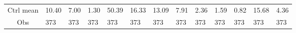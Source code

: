 {\begin{tabular}{@{}S*{12}{P}@{}}
Ctrl mean           &       10.40         &        7.00         &        1.30         &       50.39         &       16.33         &       13.09         &        7.91         &        2.36         &        1.59         &        0.82         &       15.68         &        4.36         \\
Obs                 &         373         &         373         &         373         &         373         &         373         &         373         &         373         &         373         &         373         &         373         &         373         &         373         \\
\bottomrule
\end{tabular}
}
